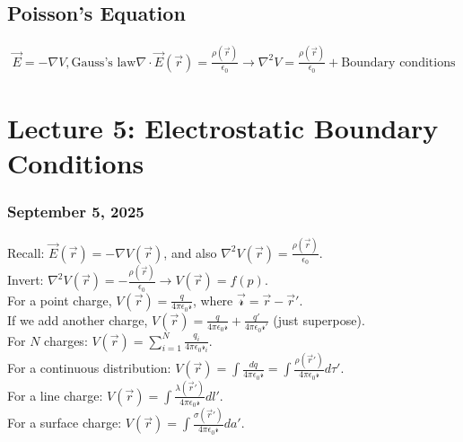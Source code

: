 \documentclass{article}
\begin{document}
\subsection{Poisson's Equation}
\begin{align*}
    \vec{E}=-\nabla V, \text{Gauss's law} \nabla\cdot\vec{E}(\vec{r})=\frac{\rho(\vec{r})}{\epsilon_0} \rightarrow \nabla^2 V = \frac{\rho(\vec{r})}{\epsilon_0} + \text{Boundary conditions}
\end{align*}

\newpage
\section{Lecture 5: Electrostatic Boundary Conditions}
\subsubsection*{September 5, 2025 \\}

Recall: $\vec{E}(\vec{r}) = -\nabla V(\vec{r})$, and also $\nabla^2 V(\vec{r}) = \frac{\rho(\vec{r})}{\epsilon_0}$. \\

Invert: $\nabla^2 V(\vec{r}) = -\frac{\rho(\vec{r})}{\epsilon_0} \rightarrow V(\vec{r}) = f(p)$. \\

For a point charge, $V(\vec{r}) = \frac{q}{4\pi\epsilon_0 \mathcal{r}}$, where $\vec{\mathcal{r}} = \vec{r} - \vec{r}'$. \\

If we add another charge, $V(\vec{r}) = \frac{q}{4\pi\epsilon_0 \mathcal{r}} + \frac{q'}{4\pi\epsilon_0 \mathcal{r}'}$ (just superpose). \\

For $N$ charges: $V(\vec{r}) = \sum_{i=1}^N \frac{q_i}{4\pi\epsilon_0 \mathcal{r}_i}$. \\

For a continuous distribution: $V(\vec{r}) = \int \frac{dq}{4\pi\epsilon_0 \mathcal{r}} = \int \frac{\rho(\vec{r}')}{4\pi\epsilon_0 \mathcal{r}} d\tau'$. \\

For a line charge: $V(\vec{r}) = \int \frac{\lambda(\vec{r}')}{4\pi\epsilon_0 \mathcal{r}} dl'$. \\

For a surface charge: $V(\vec{r}) = \int \frac{\sigma(\vec{r}')}{4\pi\epsilon_0 \mathcal{r}} da'$. \\
\end{document}

